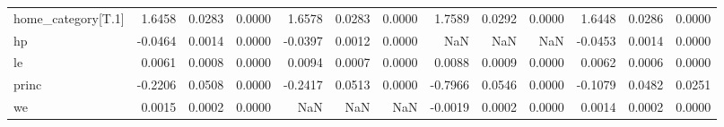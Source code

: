 \begin{tabular}{lrrrrrrrrrrrr}
home\_category[T.1]    &                 1.6458 &            0.0283 &         0.0000 &                    1.6578 &               0.0283 &            0.0000 &                    1.7589 &               0.0292 &            0.0000 &                     1.6448 &                0.0286 &             0.0000 \\
hp                    &                -0.0464 &            0.0014 &         0.0000 &                   -0.0397 &               0.0012 &            0.0000 &                       NaN &                  NaN &               NaN &                    -0.0453 &                0.0014 &             0.0000 \\
le                    &                 0.0061 &            0.0008 &         0.0000 &                    0.0094 &               0.0007 &            0.0000 &                    0.0088 &               0.0009 &            0.0000 &                     0.0062 &                0.0006 &             0.0000 \\
princ                 &                -0.2206 &            0.0508 &         0.0000 &                   -0.2417 &               0.0513 &            0.0000 &                   -0.7966 &               0.0546 &            0.0000 &                    -0.1079 &                0.0482 &             0.0251 \\
we                    &                 0.0015 &            0.0002 &         0.0000 &                       NaN &                  NaN &               NaN &                   -0.0019 &               0.0002 &            0.0000 &                     0.0014 &                0.0002 &             0.0000 \\
\bottomrule
\end{tabular}
